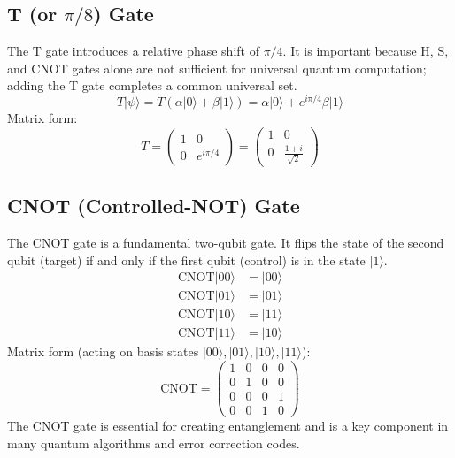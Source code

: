 \subsection*{T (or $\pi/8$) Gate}
The T gate introduces a relative phase shift of $\pi/4$. It is important because H, S, and CNOT gates alone are not sufficient for universal quantum computation; adding the T gate completes a common universal set.
\begin{equation*}
    T|\psi\rangle = T(\alpha|0\rangle + \beta|1\rangle) = \alpha|0\rangle + e^{i\pi/4}\beta|1\rangle
\end{equation*}
Matrix form:
\begin{equation*}
    T = \begin{pmatrix} 1 & 0 \\ 0 & e^{i\pi/4} \end{pmatrix} = \begin{pmatrix} 1 & 0 \\ 0 & \frac{1+i}{\sqrt{2}} \end{pmatrix}
\end{equation*}

\subsection*{CNOT (Controlled-NOT) Gate}
The CNOT gate is a fundamental two-qubit gate. It flips the state of the second qubit (target) if and only if the first qubit (control) is in the state $|1\rangle$.
\begin{align*}
    \text{CNOT}|00\rangle &= |00\rangle \\
    \text{CNOT}|01\rangle &= |01\rangle \\
    \text{CNOT}|10\rangle &= |11\rangle \\
    \text{CNOT}|11\rangle &= |10\rangle
\end{align*}
Matrix form (acting on basis states $|00\rangle, |01\rangle, |10\rangle, |11\rangle$):
\begin{equation*}
    \text{CNOT} = \begin{pmatrix} 1 & 0 & 0 & 0 \\ 0 & 1 & 0 & 0 \\ 0 & 0 & 0 & 1 \\ 0 & 0 & 1 & 0 \end{pmatrix}
\end{equation*}
The CNOT gate is essential for creating entanglement and is a key component in many quantum algorithms and error correction codes.

